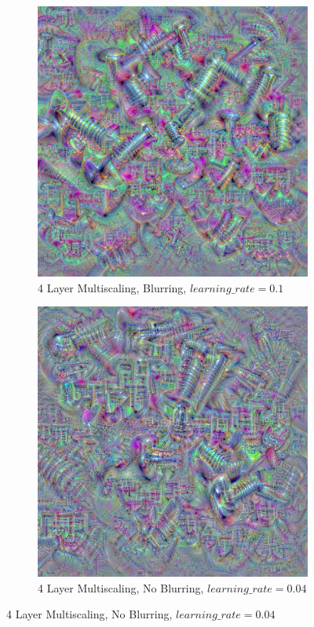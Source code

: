 \begin{figure}
    \captionsetup{justification=centering}

    \begin{subfigure}[t]{0.31\textwidth}
        \captionsetup{justification=centering}
        \centering
        \includegraphics[width=.7\linewidth]{figuras/feat_vis/experiments/classes/cl783/random_image_ci783_lr1e-1_pl4.png}
        \caption{4 Layer Multiscaling, Blurring, \(learning\_rate = 0.1\)}
    \end{subfigure}
    \hfill
    \begin{subfigure}[t]{0.31\textwidth}
        \captionsetup{justification=centering}
        \centering
        \includegraphics[width=.7\linewidth]{figuras/feat_vis/experiments/classes/cl783/random_image_ci783_lr4e-2_pl4_no-blur.png}
        \caption{4 Layer Multiscaling, No Blurring, \(learning\_rate = 0.04\)}

\end{subfigure}
\end{figure}
